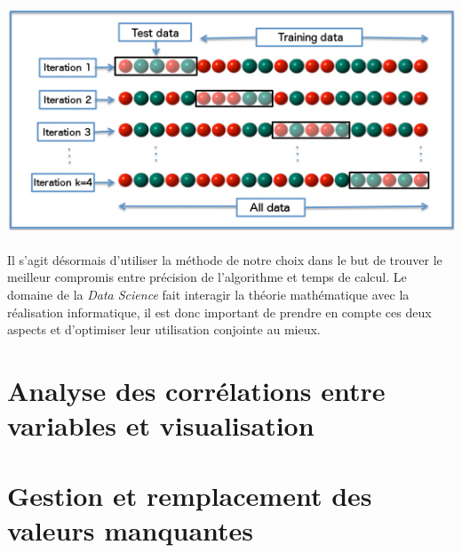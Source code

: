 \documentclass[14pt, openany]{article}
\begin{document}
\paragraph{}
\includegraphics[width=17cm]{Images/k_fold.jpg}
\begin{center}
\label{fig1}
\end{center}
\paragraph{}
Il s'agit désormais d'utiliser la méthode de notre choix dans le but de trouver le meilleur compromis entre précision de l'algorithme et temps de calcul. Le domaine de la \textit{Data Science} fait interagir la théorie mathématique avec la réalisation informatique, il est donc important de prendre en compte ces deux aspects et d'optimiser leur utilisation conjointe au mieux.
\section{Analyse des corrélations entre variables et visualisation}

\newpage
\section{Gestion et remplacement des valeurs manquantes}
\end{document}
